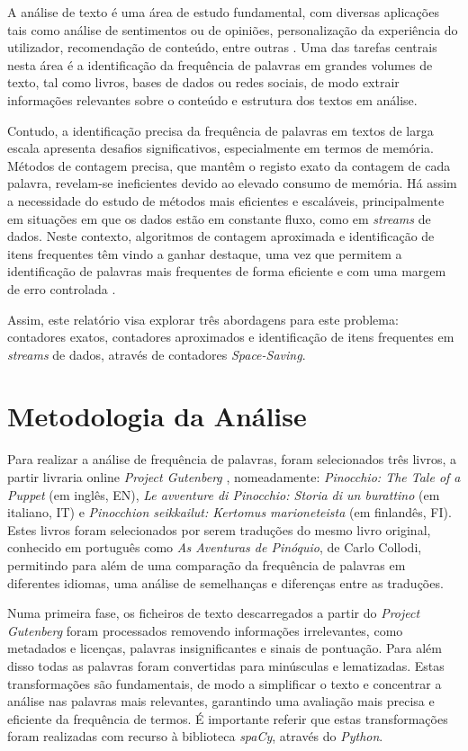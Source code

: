 \documentclass[mirror, portugues]{revdetua}
\begin{document}
A análise de texto é uma área de estudo fundamental, com diversas aplicações tais como análise de sentimentos ou de opiniões, personalização da experiência do utilizador, recomendação de conteúdo, entre outras \cite{AZ24}. Uma das tarefas centrais nesta área é a identificação da frequência de palavras em grandes volumes de texto, tal como livros, bases de dados ou redes sociais, de modo extrair informações relevantes sobre o conteúdo e estrutura dos textos em análise.

Contudo, a identificação precisa da frequência de palavras em textos de larga escala apresenta desafios significativos, especialmente em termos de memória. Métodos de contagem precisa, que mantêm o registo exato da contagem de cada palavra, revelam-se ineficientes devido ao elevado consumo de memória. Há assim a necessidade do estudo de métodos mais eficientes e escaláveis, principalmente em situações em que os dados estão em constante fluxo, como em \textit{streams} de dados. Neste contexto, algoritmos de contagem aproximada e identificação de itens frequentes têm vindo a ganhar destaque, uma vez que permitem a identificação de palavras mais frequentes de forma eficiente e com uma margem de erro controlada \cite{LH06}.

Assim, este relatório visa explorar três abordagens para este problema: contadores exatos, contadores aproximados e identificação de itens frequentes em \textit{streams} de dados, através de contadores \textit{Space-Saving}.

\section{Metodologia da Análise}

Para realizar a análise de frequência de palavras, foram selecionados três livros, a partir livraria online \textit{Project Gutenberg} \cite{PG24}, nomeadamente: \textit{Pinocchio: The Tale of a Puppet} (em inglês, EN), \textit{Le avventure di Pinocchio: Storia di un burattino} (em italiano, IT) e \textit{Pinocchion seikkailut: Kertomus marioneteista} (em finlandês, FI). Estes livros foram selecionados por serem traduções do mesmo livro original, conhecido em português como \textit{As Aventuras de Pinóquio}, de Carlo Collodi, permitindo para além de uma comparação da frequência de palavras em diferentes idiomas, uma análise de semelhanças e diferenças entre as traduções.

Numa primeira fase, os ficheiros de texto descarregados a partir do \textit{Project Gutenberg} foram processados removendo informações irrelevantes, como metadados e licenças, palavras insignificantes e sinais de pontuação. Para além disso todas as palavras foram convertidas para minúsculas e lematizadas. Estas transformações são fundamentais, de modo a simplificar o texto e concentrar a análise nas palavras mais relevantes, garantindo uma avaliação mais precisa e eficiente da frequência de termos. É importante referir que estas transformações foram realizadas com recurso à biblioteca \textit{spaCy}, através do \textit{Python}.
\end{document}
